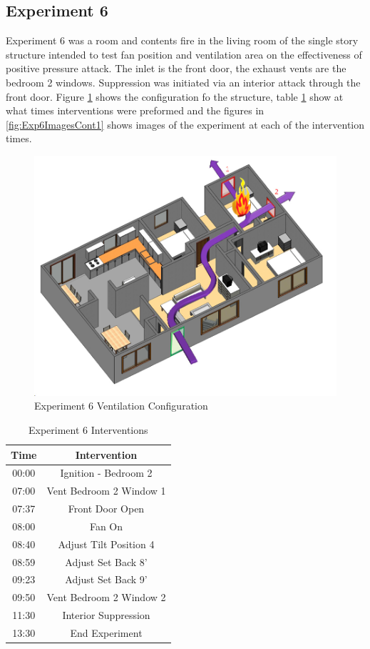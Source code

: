\documentclass{article}
\begin{document}
\subsection{Experiment 6}
Experiment 6 was a room and contents fire in the living room of the single story structure intended to test fan position and ventilation area on the effectiveness of positive pressure attack. The inlet is the front door, the exhaust vents are the bedroom 2 windows. Suppression was initiated via an interior attack through the front door. Figure \ref{fig:Exp6VentConfig} shows the configuration fo the structure, table \ref{Table:Exp6Interventions} show at what times interventions were preformed and the figures in \ref{fig:Exp6ImagesCont1} shows images of the experiment at each of the intervention times.

\begin{figure}[h!]
	\centering
	\includegraphics[width=5in]{0_Images/FireExperiments/Single_Story/Experiment_6.jpg}
	\caption{Experiment 6 Ventilation Configuration}
	\label{fig:Exp6VentConfig}
\end{figure}


\begin{table}[H]
	\centering
	\caption{Experiment 6 Interventions}
	\begin{tabular}{|c|c|} 
		\hline
		Time & Intervention \\ \hline \hline
		00:00 & Ignition - Bedroom 2 \\ \hline
		07:00 & Vent Bedroom 2 Window 1 \\ \hline
		07:37 & Front Door Open \\ \hline
		08:00 & Fan On \\ \hline
		08:40 & Adjust Tilt Position 4 \\ \hline
		08:59 & Adjust Set Back 8' \\ \hline
		09:23 & Adjust Set Back 9' \\ \hline
		09:50 & Vent Bedroom 2 Window 2 \\ \hline
		11:30 & Interior Suppression \\ \hline
		13:30 & End Experiment \\ \hline
	\end{tabular}
	\label{Table:Exp6Interventions}
\end{table}
\end{document}
